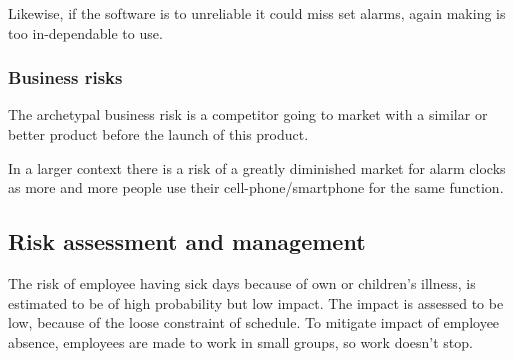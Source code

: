 \documentclass[Main]{subfiles}
\begin{document}
		Likewise, if the software is to unreliable it could miss set alarms, again making is too in-dependable to use.



		\subsubsection{Business risks} %
		\label{sub:business_risks}

		The archetypal business risk is a competitor going to market with a similar or better product before the launch of this product.

		In a larger context there is a risk of a greatly diminished market for alarm clocks as more and more people use their cell-phone/smartphone for the same function.






	\subsection{Risk assessment and management} %
	\label{sub:risk_assessment_and_management}

	The risk of employee having sick days because of own or children's illness, is estimated to be of high probability but low impact.
	The impact is assessed to be low, because of the loose constraint of schedule.
	To mitigate impact of employee absence, employees are made to work in small groups, so work doesn't stop.




\end{document}
